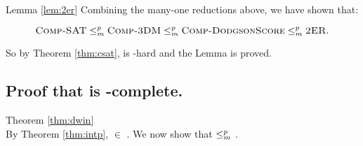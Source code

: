 \begin{claimproof}{Lemma \ref{lem:2er}}
    Combining the many-one reductions above, we have shown that:

    \[\text{{\sc Comp-SAT}} \le_m^p \text{{\sc Comp-3DM}} \le_m^p
    \text{{\sc Comp-DodgsonScore}} \le_m^p
    \text{{\sc 2ER}}.\]

    So by Theorem \ref{thm:csat},  is \tp-hard and the
    Lemma is proved.
\end{claimproof}

\subsection{Proof that  is \tp-complete.}
\begin{claimproof}{Theorem \ref{thm:dwin}}\\
    By Theorem \ref{thm:intp}, \dwin $\in$ \tp.
    We now show that  $\le_m^p$ \dwin.


\end{claimproof}